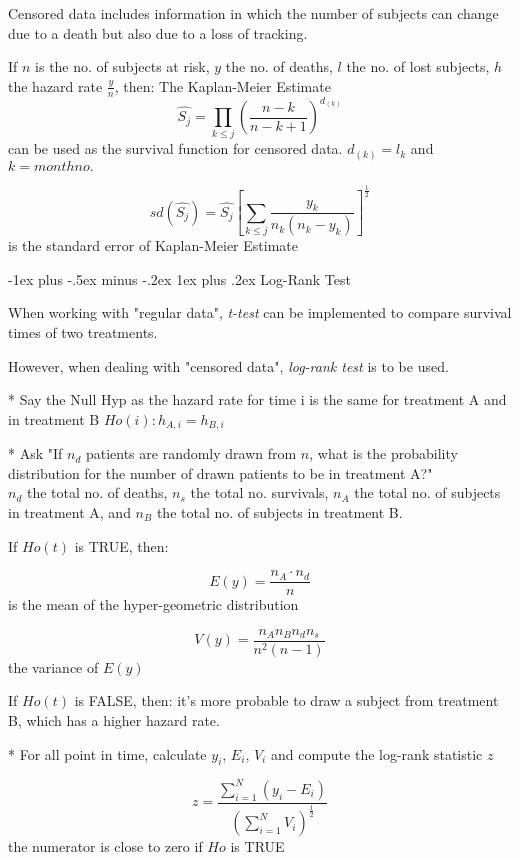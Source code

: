 \documentclass[10pt,landscape]{article}
\makeatletter
\renewcommand{\subsubsection}{\@startsection{subsubsection}{3}{0mm}%
                                {-1ex plus -.5ex minus -.2ex}%
                                {1ex plus .2ex}%
                                {\normalfont\small\bfseries}}
\makeatother
\begin{document}
\begin{multicols}{3}
Censored data includes information in which the number of subjects can change due to a death but also due to a loss of tracking.

\medskip
If $n$ is the no. of subjects at risk, $y$ the no. of deaths, $l$ the no. of lost subjects, $h$ the hazard rate $\frac{y}{n}$, then: The Kaplan-Meier Estimate $$ \hat{S_j} = \prod_{k \leq j} \left( \frac{n - k}{n - k + 1} \right)^{d_{(k)}} $$ can be used as the survival function for censored data. $d_{(k)} = l_k$ and $k = month no.$

$$ sd(\hat{S_j}) = \hat{S_j} \left[\sum_{k \leq j} \frac{y_k}{n_k (n_k - y_k)}\right]^{\frac{1}{2}} $$ is the standard error of Kaplan-Meier Estimate

\subsubsection{Log-Rank Test}

When working with "regular data", \emph{t-test} can be implemented to compare survival times of two treatments.

\medskip
However, when dealing with "censored data", \emph{log-rank test} is to be used.

* Say the Null Hyp as the hazard rate for time i is the same for treatment A and in treatment B $Ho(i) : h_{A,i} = h_{B,i}$

* Ask "If $n_d$ patients are randomly drawn from $n$, what is the probability distribution for the number of drawn patients to be in treatment A?" \\
$n_d$ the total no. of deaths, $n_s$ the total no. survivals, $n_A$ the total no. of subjects in treatment A, and $n_B$ the total no. of subjects in treatment B.

\medskip
If $Ho(t)$ is TRUE, then:

$$ E(y) = \frac{n_A \cdot n_d}{n} $$ is the mean of the hyper-geometric distribution

$$ V(y) = \frac{n_A n_B n_d n_s}{n^2 (n - 1)} $$ the variance of $E(y)$

\medskip
If $Ho(t)$ is FALSE, then: it's more probable to draw a subject from treatment B, which has a higher hazard rate.

* For all point in time, calculate $y_i$, $E_i$, $V_i$ and compute the log-rank statistic $z$

$$ z = \frac{\sum_{i = 1}^{N} (y_i - E_i)}{\left(\sum_{i = 1}^{N} V_i\right)^{\frac{1}{2}}} $$ the numerator is close to zero if $Ho$ is TRUE


\end{multicols}
\end{document}
